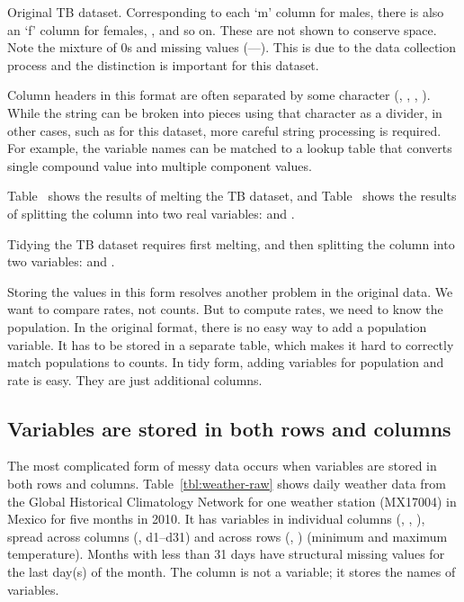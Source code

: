 \documentclass[article]{jss}
\begin{document}
\begin{table}[htbp]
  \centering
  
  \caption{Original TB dataset. Corresponding to each `m' column for males, there is also an `f' column for females, ,  and so on. These are not shown to conserve space. Note the mixture of 0s and missing values (---). This is due to the data collection process and the distinction is important for this dataset.}
  \label{tbl:tb-raw}
\end{table}

Column headers in this format are often separated by some character (, \code{-}, \code{\_}, \code{:}). While the string can be broken into pieces using that character as a divider, in other cases, such as for this dataset, more careful string processing is required. For example, the variable names can be matched to a lookup table that converts single compound value into multiple component values. 

Table~ shows the results of melting the TB dataset, and Table~ shows the results of splitting the column  into two real variables:  and .  

\begin{table}[htbp]
  \centering
  \hspace{2em}%
  
  \caption{Tidying the TB dataset requires first melting, and then splitting the  column into two variables:  and .}
  \label{tbl:tb-clean}
\end{table}

Storing the values in this form resolves another problem in the original data. We want to compare rates, not counts. But to compute rates, we need to know the population. In the original format, there is no easy way to add a population variable. It has to be stored in a separate table, which makes it hard to correctly match populations to counts. In tidy form, adding variables for population and rate is easy. They are just additional columns.

\subsection{Variables are stored in both rows and columns}

The most complicated form of messy data occurs when variables are stored in both rows and columns. Table~\ref{tbl:weather-raw} shows daily weather data from the Global Historical Climatology Network for one weather station (MX17004) in Mexico for five months in 2010. It has variables in individual columns (, , ), spread across columns (, d1--d31) and across rows (, ) (minimum and maximum temperature). Months with less than 31 days have structural missing values for the last day(s) of the month. The  column is not a variable; it stores the names of variables.
\end{document}
